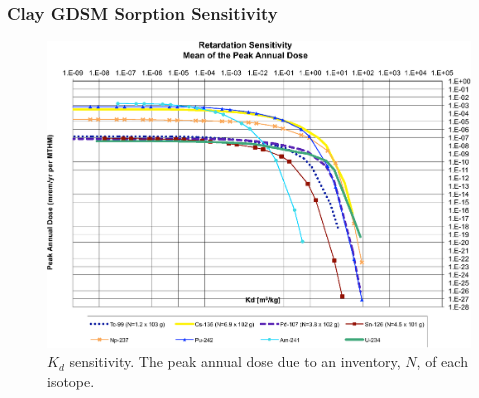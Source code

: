 
\begin{frame}[ctb!]
\frametitle{Clay GDSM Sorption Sensitivity}
\begin{figure}[ht]
\centering
\includegraphics[width=0.7\linewidth]{./nuclide_demonstration/Retardation_Summary_kd.eps}
\caption{$K_d$ sensitivity.  The peak annual dose due to an inventory, 
$N$, of each isotope.}
\label{fig:KdSum}
\end{figure}

\end{frame}
